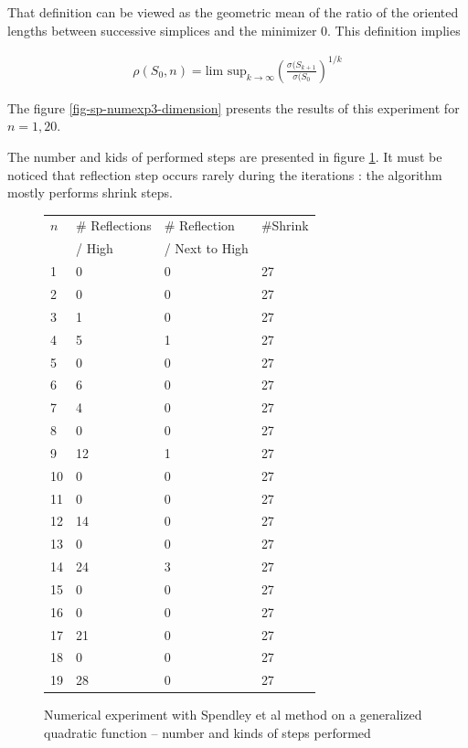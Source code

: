 That definition can be viewed as the geometric mean of the ratio of the 
oriented lengths between successive simplices and the minimizer 0.
This definition implies 

\begin{eqnarray}
\label{rho-sp-rate-convergence2}
\rho(S_0,n) = \textrm{lim sup}_{k\rightarrow \infty} 
\left( \frac{\sigma(S_{k+1}}{\sigma(S_0}\right)^{1/k}
\end{eqnarray}

The figure \ref{fig-sp-numexp3-dimension} presents the results of this 
experiment for $n=1,20$. 

The number and kids of performed steps are presented in figure \ref{fig-sp-numexp3-nbsteps}.
It must be noticed that reflection step occurs rarely during the iterations : the algorithm mostly performs 
shrink steps.

\begin{figure}[htbp]
\begin{center}
\begin{tiny}
\begin{tabular}{|l|l|l|l|}
\hline
$n$ & \# Reflections & \# Reflection & \#Shrink\\
 & / High & / Next to High & \\
\hline
1 & 0 & 0 & 27\\
2 & 0 & 0 & 27\\
3 & 1 & 0 & 27\\
4 & 5 & 1 & 27\\
5 & 0 & 0 & 27\\
6 & 6 & 0 & 27\\
7 & 4 & 0 & 27\\
8 & 0 & 0 & 27\\
9 & 12 & 1 & 27\\
10 & 0 & 0 & 27\\
11 & 0 & 0 & 27\\
12 & 14 & 0 & 27\\
13 & 0 & 0 & 27\\
14 & 24 & 3 & 27\\
15 & 0 & 0 & 27\\
16 & 0 & 0 & 27\\
17 & 21 & 0 & 27\\
18 & 0 & 0 & 27\\
19 & 28 & 0 & 27\\
\hline
\end{tabular}
\end{tiny}
\end{center}
\caption{Numerical experiment with Spendley et al method on a generalized quadratic function -- number 
and kinds of steps performed}
\label{fig-sp-numexp3-nbsteps}
\end{figure}

